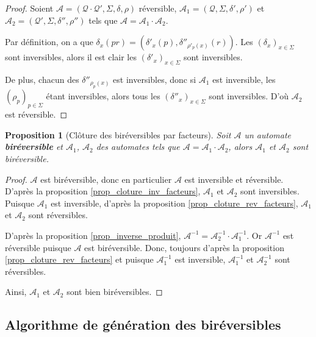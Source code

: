 \documentclass[11pt,a4paper]{article}
\newtheorem{prop}{Proposition}
\begin{document}
\begin{proof}
  Soient $\mathcal{A}=\left(\mathcal{Q\cdot Q'}, \Sigma, \delta, \rho\right)$ réversible, $\mathcal{A}_1=\left(\mathcal{Q}, \Sigma, \delta', \rho'\right)$ et $\mathcal{A}_2=\left(\mathcal{Q'}, \Sigma, \delta'', \rho''\right)$ tels que $\mathcal{A} = \mathcal{A}_1\cdot\mathcal{A}_2$.

  Par définition, on a que $\delta_x(pr) = (\delta'_x(p), \delta''_{\rho'_p(x)}(r))$. Les ${(\delta_x)}_{x\in\Sigma}$ sont inversibles, alors il est clair les ${(\delta'_x)}_{x\in\Sigma}$ sont inversibles.

  De plus, chacun des $\delta''_{\rho_p(x)}$ est inversibles, donc si $\mathcal{A}_1$ est inversible, les ${(\rho_p)}_{p\in\Sigma}$ étant inversibles, alors tous les ${(\delta''_x)}_{x\in\Sigma}$ sont inversibles. D'où $\mathcal{A}_2$ est réversible.
\end{proof}

\begin{prop}[Clôture des biréversibles par facteurs]
  Soit $\mathcal{A}$ un automate \textbf{biréversible} et $\mathcal{A}_1$, $\mathcal{A}_2$ des automates tels que $\mathcal{A}=\mathcal{A}_1\cdot\mathcal{A}_2$, alors $\mathcal{A}_1$ et $\mathcal{A}_2$ sont biréversible.
\end{prop}

\begin{proof}
    $\mathcal{A}$ est biréversible, donc en particulier $\mathcal{A}$ est inversible et réversible. D'après la proposition \ref{prop_cloture_inv_facteurs}, $\mathcal{A}_1$ et $\mathcal{A}_2$ sont inversibles. Puisque $\mathcal{A}_1$ est inversible, d'après la proposition \ref{prop_cloture_rev_facteurs}, $\mathcal{A}_1$ et $\mathcal{A}_2$ sont réversibles.

    D'après la proposition \ref{prop_inverse_produit}, $\mathcal{A}^{-1} = \mathcal{A}_2^{-1} \cdot \mathcal{A}_1^{-1}$. Or $\mathcal{A}^{-1}$ est réversible puisque $\mathcal{A}$ est biréversible. Donc, toujours d'après la proposition \ref{prop_cloture_rev_facteurs} et puisque $\mathcal{A}_1^{-1}$ est inversible, $\mathcal{A}_1^{-1}$ et $\mathcal{A}_2^{-1}$ sont réversibles.

    Ainsi, $\mathcal{A}_1$ et $\mathcal{A}_2$ sont bien biréversibles.
\end{proof}

\subsection{Algorithme de génération des biréversibles\label{sec:gen}}
\end{document}
